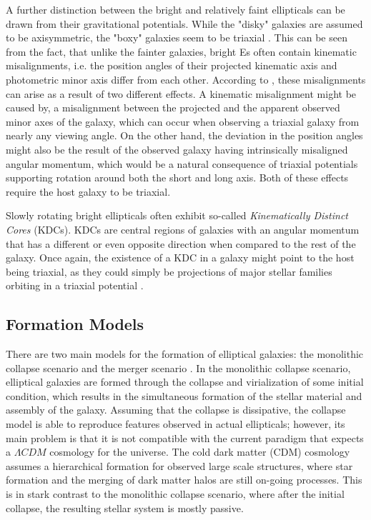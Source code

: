 \documentclass[english, oneside]{HYgradu}
\begin{document}
A further distinction between the bright and relatively faint ellipticals can be drawn from their gravitational potentials. While the "disky" galaxies are assumed to be axisymmetric, the "boxy" galaxies seem to be triaxial \citep{GalaxyFormationAndEvo2010}. This can be seen from the fact, that unlike the fainter galaxies, bright Es often contain kinematic misalignments, i.e. the position angles of their projected kinematic axis and photometric minor axis differ from each other. According to \cite{GalaxyFormationAndEvo2010}, these misalignments can arise as a result of two different effects. A kinematic misalignment might be caused by, a misalignment between the projected and the apparent observed minor axes of the galaxy, which can occur when observing a triaxial galaxy from nearly any viewing angle. On the other hand, the deviation in the position angles might also be the result of the observed galaxy having intrinsically misaligned angular momentum, which would be a natural consequence of triaxial potentials supporting rotation around both the short and long axis. Both of these effects require the host galaxy to be triaxial.

Slowly rotating bright ellipticals often exhibit so-called \textit{Kinematically Distinct Cores} (KDCs). KDCs are central regions of galaxies with an angular momentum that has a different or even opposite direction when compared to the rest of the galaxy. Once again, the existence of a KDC in a galaxy might point to the host being triaxial, as they could simply be projections of major stellar families orbiting in a triaxial potential \citep{Statler1991, GalaxyFormationAndEvo2010}.%

\subsection{Formation Models}

There are two main models for the formation of elliptical galaxies: the monolithic collapse scenario and the merger scenario \citep{GalaxyFormationAndEvo2010}. In the monolithic collapse scenario, elliptical galaxies are formed through the collapse and virialization of some initial condition, which results in the simultaneous formation of the stellar material and assembly of the galaxy. Assuming that the collapse is dissipative, the collapse model is able to reproduce features observed in actual ellipticals; however, its main problem is that it is not compatible with the current paradigm that expects a $\Lambda CDM$ cosmology for the universe. The cold dark matter (CDM) cosmology assumes a hierarchical formation for observed large scale structures, where star formation and the merging of dark matter halos are still on-going processes. This is in stark contrast to the monolithic collapse scenario, where after the initial collapse, the resulting stellar system is mostly passive.
\end{document}
